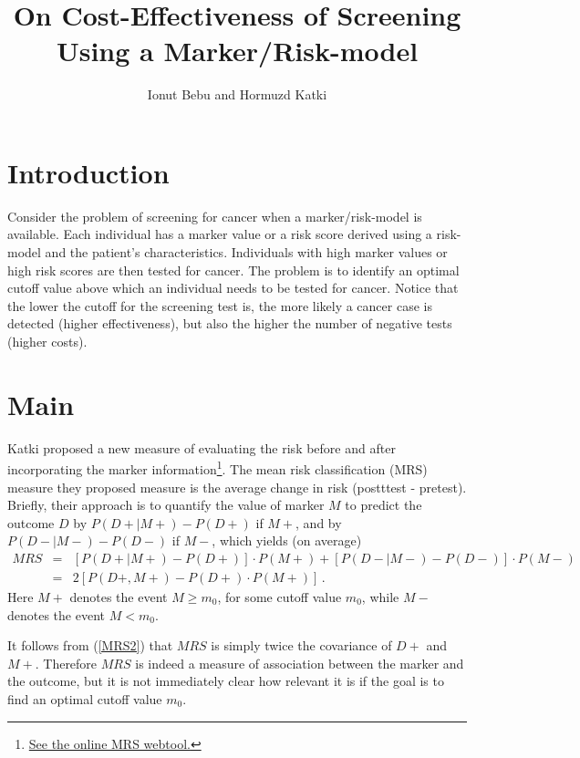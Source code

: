 \documentclass[11pt]{article}
\begin{document}


\title{On Cost-Effectiveness of Screening Using a Marker/Risk-model}
\author{Ionut Bebu and Hormuzd Katki}
\maketitle

\section{Introduction}
Consider the problem of screening for cancer when a marker/risk-model is available. Each individual has a marker value or a risk score derived using a risk-model and the patient's characteristics. Individuals with high marker values or high risk scores are then tested for cancer. The problem is to identify an optimal cutoff value above which an individual needs to be tested for cancer. Notice that the lower the cutoff for the screening test is, the more likely a cancer case is detected (higher effectiveness), but also the higher the number of negative tests (higher costs). 

\section{Main} 
Katki \cite{katki} proposed a new measure of evaluating the risk before and after incorporating the marker information\footnote{\href{http://analysistools.nci.nih.gov/biomarkerTools}{See the online MRS webtool.}}. The mean risk classification (MRS) measure they proposed measure is the average change in risk (postttest - pretest). Briefly, their approach is to quantify the value of marker $M$ to predict the outcome $D$ by $P(D+|M+) - P(D+)$ if $M+$, and by $P(D-|M-) - P(D-)$ if $M-$, which yields (on average)
\begin{eqnarray}\label{MRS}
MRS &=& [P(D+|M+) - P(D+)]\cdot P(M+) + [P(D-|M-) - P(D-)]\cdot P(M-)\\    \label{MRS2}
    &=& 2[P(D+,M+) - P(D+)\cdot P(M+)]\,. 
\end{eqnarray} 
Here $M+$ denotes the event $M\geq m_0$, for some cutoff value $m_0$, while $M-$ denotes the event $M< m_0$.

It follows from (\ref{MRS2}) that $MRS$ is simply twice the covariance of $D+$ and $M+$. Therefore $MRS$ is indeed a measure of association between the marker and the outcome, but it is not immediately clear how relevant it is if the goal is to find an optimal cutoff value $m_0$. 
\end{document}
